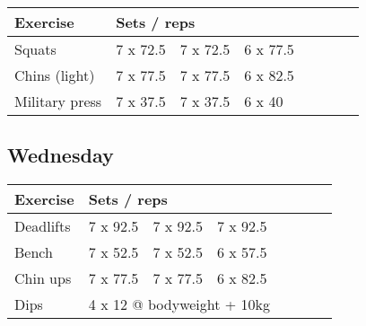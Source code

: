\documentclass[12pt, a4paper]{article}%
\begin{document}
  \begin{tabular}{l|lllllll}
  \hspace{0.75em} \textbf{Exercise} & \multicolumn{ 7 }{l}{ \textbf{Sets / reps} } \\ \hline

            \hspace{0.75em} Squats
            & 7 x 72.5
            & 7 x 72.5
            & 6 x 77.5
            & 
            & 
            & 
            & 
            \\


            \hspace{0.75em} Chins (light)
            & 7 x 77.5
            & 7 x 77.5
            & 6 x 82.5
            & 
            & 
            & 
            & 
            \\


            \hspace{0.75em} Military press
            & 7 x 37.5
            & 7 x 37.5
            & 6 x 40
            & 
            & 
            & 
            & 
            \\


  \end{tabular}

  \subsection*{\hspace{0.5em} Wednesday }


  \begin{tabular}{l|lllllll}
  \hspace{0.75em} \textbf{Exercise} & \multicolumn{ 7 }{l}{ \textbf{Sets / reps} } \\ \hline

            \hspace{0.75em} Deadlifts
            & 7 x 92.5
            & 7 x 92.5
            & 7 x 92.5
            & 
            & 
            & 
            & 
            \\


            \hspace{0.75em} Bench
            & 7 x 52.5
            & 7 x 52.5
            & 6 x 57.5
            & 
            & 
            & 
            & 
            \\


            \hspace{0.75em} Chin ups
            & 7 x 77.5
            & 7 x 77.5
            & 6 x 82.5
            & 
            & 
            & 
            & 
            \\


   \hspace{0.75em} Dips &  \multicolumn{ 7 }{l}{ 4 x 12 @ bodyweight + 10kg } \\
  \end{tabular}
\end{document}
